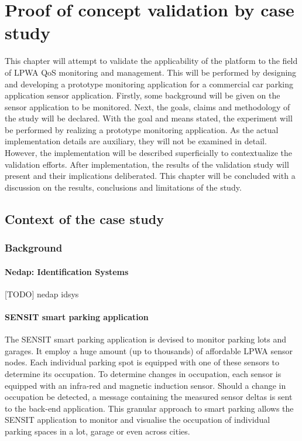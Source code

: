 \newcommand{\idsystems}{\nedap Identification Services }
\newcommand{\nedap}{Nedap }
\newcommand{\ublox}{u-blox }
\newcommand{\sensit}{SENSIT }
\chapter{Proof of concept validation by case study}
\label{ch:validation}
This chapter will attempt to validate the applicability of the platform to the field of LPWA QoS monitoring and management. This will be performed by designing and developing a prototype monitoring application for a commercial car parking application sensor application. Firstly, some background will be given on the sensor application to be monitored. Next, the goals, claims and methodology of the study will be declared. With the goal and means stated, the experiment will be performed by realizing a prototype monitoring application. As the actual implementation details are auxiliary, they will not be examined in detail. However, the implementation will be described superficially to contextualize the validation efforts. After implementation, the results of the validation study will present and their implications deliberated. This chapter will be concluded with a discussion on the results, conclusions and limitations of the study.
\section{Context of the case study}
\subsection{Background}
\label{sec:sensit}
\subsubsection*{Nedap: Identification Systems}
[TODO]
nedap \cite{web:idsystems}idsys \cite{web:sensit}
\subsubsection*{\sensit smart parking application}
The \sensit \cite{web:sensit} smart parking application is devised to monitor parking lots and garages. It employ a huge amount (up to thousands) of affordable LPWA sensor nodes. Each individual parking spot is equipped with one of these sensors to determine its occupation. To determine changes in occupation, each sensor is equipped with an infra-red and magnetic induction sensor. Should a change in occupation be detected, a message containing the measured sensor deltas is sent to the back-end application. This granular approach to smart parking allows the \sensit application to monitor and visualise the occupation of individual parking spaces in a lot, garage or even across cities.

